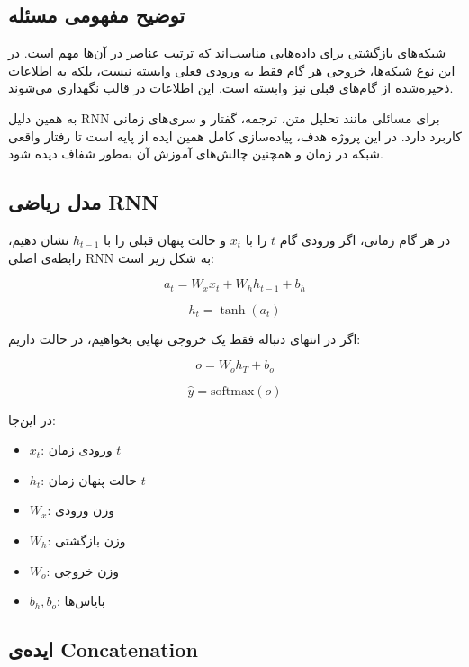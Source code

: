 \documentclass[12pt,a4paper]{article}
\begin{document}
\subsection{توضیح مفهومی مسئله}

\begin{tcolorbox}[
	colback=softgreen,
	colframe=mygreen,
	title={ایده‌ی کلی RNN},
	fonttitle=\bfseries
	]
	
	شبکه‌های بازگشتی برای داده‌هایی مناسب‌اند که ترتیب عناصر در آن‌ها مهم است.
	در این نوع شبکه‌ها، خروجی هر گام فقط به ورودی فعلی وابسته نیست، بلکه به
	اطلاعات ذخیره‌شده از گام‌های قبلی نیز وابسته است. این اطلاعات در قالب
	 نگهداری می‌شوند.
	
	به همین دلیل RNN برای مسائلی مانند تحلیل متن، ترجمه، گفتار و سری‌های زمانی
	کاربرد دارد. در این پروژه هدف، پیاده‌سازی کامل همین ایده از پایه است تا
	رفتار واقعی شبکه در زمان و همچنین چالش‌های آموزش آن به‌طور شفاف دیده شود.
\end{tcolorbox}

\subsection{مدل ریاضی RNN}

در هر گام زمانی، اگر ورودی گام \(t\) را با \(x_t\) و حالت پنهان قبلی را با
\(h_{t-1}\) نشان دهیم، رابطه‌ی اصلی RNN به شکل زیر است:

\[
a_t = W_x x_t + W_h h_{t-1} + b_h
\]

\[
h_t = \tanh(a_t)
\]

اگر در انتهای دنباله فقط یک خروجی نهایی بخواهیم، در حالت 
داریم:

\[
o = W_o h_T + b_o
\]

\[
\hat{y} = \text{softmax}(o)
\]

در این‌جا:
\begin{itemize}
	\item \(x_t\): ورودی زمان \(t\)
	\item \(h_t\): حالت پنهان زمان \(t\)
	\item \(W_x\): وزن ورودی
	\item \(W_h\): وزن بازگشتی
	\item \(W_o\): وزن خروجی
	\item \(b_h, b_o\): بایاس‌ها
\end{itemize}

\subsection{ایده‌ی Concatenation}
\end{document}
